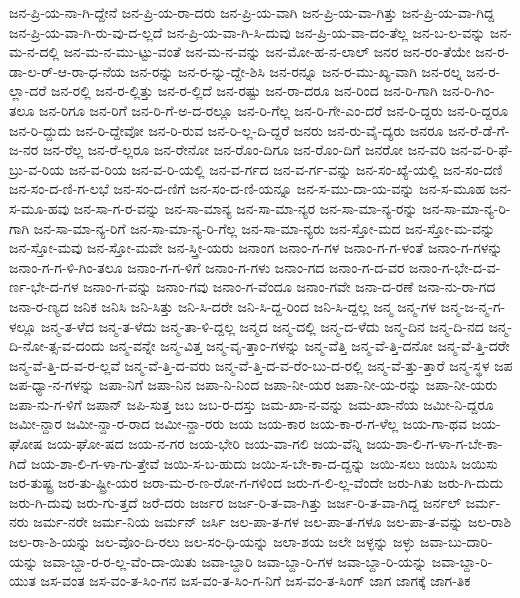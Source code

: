 {ಜನ-ಪ್ರಿ-ಯ-ನಾ-ಗಿ-ದ್ದೇನೆ
ಜನ-ಪ್ರಿ-ಯ-ರಾ-ದರು
ಜನ-ಪ್ರಿ-ಯ-ವಾಗಿ
ಜನ-ಪ್ರಿ-ಯ-ವಾ-ಗಿತ್ತು
ಜನ-ಪ್ರಿ-ಯ-ವಾ-ಗಿದ್ದ
ಜನ-ಪ್ರಿ-ಯ-ವಾ-ಗಿ-ರು-ವು-ದ-ಲ್ಲದೆ
ಜನ-ಪ್ರಿ-ಯ-ವಾ-ಗಿ-ಸಿ-ದುವು
ಜನ-ಪ್ರಿ-ಯ-ವಾ-ದಂ-ತೆಲ್ಲ
ಜನ-ಬ-ಲ-ವನ್ನು
ಜನ-ಮ-ನ-ದಲ್ಲಿ
ಜನ-ಮ-ನ-ಮು-ಟ್ಟು-ವಂತೆ
ಜನ-ಮ-ನ-ವನ್ನು
ಜನ-ಮೋ-ಹ-ನ-ಲಾಲ್
ಜನರ
ಜನ-ರಂ-ತೆಯೇ
ಜನ-ರ-ಡಾ-ಲ-ರ್-ಆ-ರಾ-ಧ-ನೆಯ
ಜನ-ರನ್ನು
ಜನ-ರ-ನ್ನು-ದ್ದೇ-ಶಿಸಿ
ಜನ-ರನ್ನೂ
ಜನ-ರ-ಮು-ಖ್ಯ-ವಾಗಿ
ಜನ-ರಲ್ನ
ಜನ-ರ-ಲ್ಲಾ-ದರೆ
ಜನ-ರಲ್ಲಿ
ಜನ-ರ-ಲ್ಲಿತ್ತು
ಜನ-ರ-ಲ್ಲಿದೆ
ಜನ-ರಷ್ಟು
ಜನ-ರಾ-ದರೂ
ಜನ-ರಿಂದ
ಜನ-ರಿ-ಗಾಗಿ
ಜನ-ರಿ-ಗಿಂ-ತಲೂ
ಜನ-ರಿಗೂ
ಜನ-ರಿಗೆ
ಜನ-ರಿ-ಗೆ-ಅ-ದ-ರಲ್ಲೂ
ಜನ-ರಿ-ಗೆಲ್ಲ
ಜನ-ರಿ-ಗೇ-ಎಂ-ದರೆ
ಜನ-ರಿ-ದ್ದರು
ಜನ-ರಿ-ದ್ದರೂ
ಜನ-ರಿ-ದ್ದುದು
ಜನ-ರಿ-ದ್ದೇವೋ
ಜನ-ರಿ-ರುವ
ಜನ-ರಿ-ಲ್ಲ-ದಿ-ದ್ದರೆ
ಜನರು
ಜನ-ರು-ವೈ-ದ್ಯರು
ಜನರೂ
ಜನ-ರೆ-ಡೆ-ಗೆ-ಜ-ನರ
ಜನ-ರೆಲ್ಲ
ಜನ-ರೆ-ಲ್ಲರೂ
ಜನ-ರೇನೋ
ಜನ-ರೊಂ-ದಿಗೂ
ಜನ-ರೊಂ-ದಿಗೆ
ಜನರೋ
ಜನ-ವರಿ
ಜನ-ವ-ರಿ-ಫೆ-ಬ್ರು-ವ-ರಿಯ
ಜನ-ವ-ರಿಯ
ಜನ-ವ-ರಿ-ಯಲ್ಲಿ
ಜನ-ವ-ರ್ಗದ
ಜನ-ವ-ರ್ಗ-ವನ್ನು
ಜನ-ಸಂ-ಖ್ಯೆ-ಯಲ್ಲಿ
ಜನ-ಸಂ-ದಣಿ
ಜನ-ಸಂ-ದ-ಣಿ-ಗ-ಲಭೆ
ಜನ-ಸಂ-ದ-ಣಿಗೆ
ಜನ-ಸಂ-ದ-ಣಿ-ಯನ್ನೂ
ಜನ-ಸ-ಮು-ದಾ-ಯ-ವನ್ನು
ಜನ-ಸ-ಮೂಹ
ಜನ-ಸ-ಮೂ-ಹವು
ಜನ-ಸಾ-ಗ-ರ-ವನ್ನು
ಜನ-ಸಾ-ಮಾನ್ಯ
ಜನ-ಸಾ-ಮಾ-ನ್ಯರ
ಜನ-ಸಾ-ಮಾ-ನ್ಯ-ರನ್ನು
ಜನ-ಸಾ-ಮಾ-ನ್ಯ-ರಿ-ಗಾಗಿ
ಜನ-ಸಾ-ಮಾ-ನ್ಯ-ರಿಗೆ
ಜನ-ಸಾ-ಮಾ-ನ್ಯ-ರಿ-ಗೆಲ್ಲ
ಜನ-ಸಾ-ಮಾ-ನ್ಯರು
ಜನ-ಸ್ತೋ-ಮದ
ಜನ-ಸ್ತೋ-ಮ-ವನ್ನು
ಜನ-ಸ್ತೋ-ಮವು
ಜನ-ಸ್ತೋ-ಮವೇ
ಜನ-ಸ್ತ್ರೀ-ಯರು
ಜನಾಂಗ
ಜನಾಂ-ಗ-ಗಳ
ಜನಾಂ-ಗ-ಗ-ಳಂತೆ
ಜನಾಂ-ಗ-ಗಳನ್ನು
ಜನಾಂ-ಗ-ಗ-ಳಿ-ಗಿಂ-ತಲೂ
ಜನಾಂ-ಗ-ಗ-ಳಿಗೆ
ಜನಾಂ-ಗ-ಗಳು
ಜನಾಂ-ಗದ
ಜನಾಂ-ಗ-ದ-ವರ
ಜನಾಂ-ಗ-ಭೇ-ದ-ವ-ರ್ಣ-ಭೇ-ದ-ಗಳ
ಜನಾಂ-ಗ-ವನ್ನು
ಜನಾಂ-ಗವು
ಜನಾಂ-ಗ-ವೆಂದೂ
ಜನಾಂ-ಗವೇ
ಜನಾ-ದ-ರಣೆ
ಜನಾ-ನು-ರಾ-ಗದ
ಜನಾ-ರ-ಣ್ಯದ
ಜನಿಕ
ಜನಿಸಿ
ಜನಿ-ಸಿತ್ತು
ಜನಿ-ಸಿ-ದರೇ
ಜನಿ-ಸಿ-ದ್ದ-ರಿಂದ
ಜನಿ-ಸಿ-ದ್ದಲ್ಲ
ಜನ್ಮ
ಜನ್ಮ-ಗಳ
ಜನ್ಮ-ಜ-ನ್ಮ-ಗ-ಳಲ್ಲೂ
ಜನ್ಮ-ತ-ಳೆದ
ಜನ್ಮ-ತ-ಳೆದು
ಜನ್ಮ-ತಾ-ಳಿ-ದ್ದಲ್ಲ
ಜನ್ಮದ
ಜನ್ಮ-ದಲ್ಲಿ
ಜನ್ಮ-ದ-ಳೆದು
ಜನ್ಮ-ದಿನ
ಜನ್ಮ-ದಿ-ನದ
ಜನ್ಮ-ದಿ-ನೋ-ತ್ಸ-ವ-ದಂದು
ಜನ್ಮ-ವನ್ನೇ
ಜನ್ಮ-ವಿತ್ತ
ಜನ್ಮ-ವೃ-ತ್ತಾಂ-ಗಳನ್ನು
ಜನ್ಮ-ವೆತ್ತಿ
ಜನ್ಮ-ವೆ-ತ್ತಿ-ದನೋ
ಜನ್ಮ-ವೆ-ತ್ತಿ-ದರೇ
ಜನ್ಮ-ವೆ-ತ್ತಿ-ದ-ವ-ರ-ಲ್ಲವೆ
ಜನ್ಮ-ವೆ-ತ್ತಿ-ದ-ವರು
ಜನ್ಮ-ವೆ-ತ್ತಿ-ದ-ವ-ರೆಂ-ಬು-ದ-ರಲ್ಲಿ
ಜನ್ಮ-ವೆ-ತ್ತು-ತ್ತಾರೆ
ಜನ್ಮ-ಸ್ಥಳ
ಜಪ
ಜಪ-ಧ್ಯಾ-ನ-ಗಳನ್ನು
ಜಪಾ-ನಿಗೆ
ಜಪಾ-ನಿನ
ಜಪಾ-ನಿ-ನಿಂದ
ಜಪಾ-ನೀ-ಯರ
ಜಪಾ-ನೀ-ಯ-ರನ್ನು
ಜಪಾ-ನೀ-ಯರು
ಜಪಾ-ನು-ಗ-ಳಿಗೆ
ಜಪಾನ್
ಜಪಿ-ಸುತ್ತ
ಜಬ
ಜಬ-ರ-ದಸ್ತು
ಜಮ-ಖಾ-ನ-ವನ್ನು
ಜಮ-ಖಾ-ನೆಯ
ಜಮೀ-ನಿ-ದ್ದರೂ
ಜಮೀ-ನ್ದಾರ
ಜಮೀ-ನ್ದಾ-ರ-ರಾದ
ಜಮೀ-ನ್ದಾ-ರರು
ಜಯ
ಜಯ-ಕಾರ
ಜಯ-ಕಾ-ರ-ಗ-ಳೆಲ್ಲ
ಜಯ-ಗಾ-ಥವ
ಜಯ-ಘೋಷ
ಜಯ-ಘೋ-ಷದ
ಜಯ-ನ-ಗರ
ಜಯ-ಭೇರಿ
ಜಯ-ವಾ-ಗಲಿ
ಜಯ-ವೆನ್ನಿ
ಜಯ-ಶಾ-ಲಿ-ಗ-ಳಾ-ಗ-ಬೇ-ಕಾ-ಗಿದೆ
ಜಯ-ಶಾ-ಲಿ-ಗ-ಳಾ-ಗು-ತ್ತೇವೆ
ಜಯಿ-ಸ-ಬ-ಹುದು
ಜಯಿ-ಸ-ಬೇ-ಕಾ-ದ-ದ್ದನ್ನು
ಜಯಿ-ಸಲು
ಜಯಿಸಿ
ಜಯಿಸು
ಜರ-ತುಷ್ಟ್ರ
ಜರ-ತು-ಷ್ಟ್ರೀ-ಯರ
ಜರಾ-ಮ-ರ-ಣ-ರೋ-ಗ-ಗಳಿಂದ
ಜರು-ಗ-ಲಿ-ಲ್ಲ-ವೆಂದೇ
ಜರು-ಗಿತು
ಜರು-ಗಿ-ದುದು
ಜರು-ಗಿ-ದುವು
ಜರು-ಗು-ತ್ತದೆ
ಜರೆ-ದರು
ಜರ್ಜರ
ಜರ್ಜ-ರಿ-ತ-ವಾ-ಗಿತ್ತು
ಜರ್ಜ-ರಿ-ತ-ವಾ-ಗಿದ್ದ
ಜರ್ನಲ್
ಜರ್ಮ-ನರು
ಜರ್ಮ-ನರೇ
ಜರ್ಮ-ನಿಯ
ಜರ್ಮನ್
ಜರ್ಸಿ
ಜಲ-ಪಾ-ತ-ಗಳ
ಜಲ-ಪಾ-ತ-ಗಳೂ
ಜಲ-ಪಾ-ತ-ವನ್ನು
ಜಲ-ರಾಶಿ
ಜಲ-ರಾ-ಶಿ-ಯನ್ನು
ಜಲ-ವೊಂ-ದಿ-ರಲು
ಜಲ-ಸಂ-ಧಿ-ಯನ್ನು
ಜಲಾ-ಶಯ
ಜಲೇ
ಜಳ್ಳನ್ನು
ಜಳ್ಳು
ಜವಾ-ಬು-ದಾರಿ-ಯನ್ನು
ಜವಾ-ಬ್ದಾ-ರ-ರ-ಲ್ಲ-ವೆಂ-ದಾ-ಯಿತು
ಜವಾ-ಬ್ದಾರಿ
ಜವಾ-ಬ್ದಾ-ರಿ-ಗಳ
ಜವಾ-ಬ್ದಾ-ರಿ-ಯನ್ನು
ಜವಾ-ಬ್ದಾ-ರಿ-ಯುತ
ಜಸ-ವಂತ
ಜಸ-ವಂ-ತ-ಸಿಂ-ಗನ
ಜಸ-ವಂ-ತ-ಸಿಂ-ಗ-ನಿಗೆ
ಜಸ-ವಂ-ತ-ಸಿಂಗ್
ಜಾಗ
ಜಾಗಕ್ಕೆ
ಜಾಗ-ತಿಕ
}
